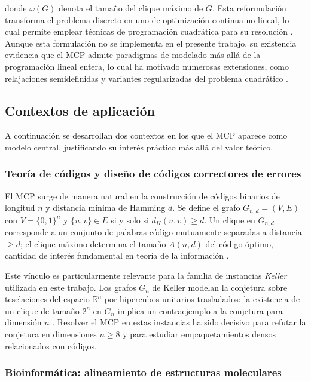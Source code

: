 \noindent donde $\omega(G)$ denota el tamaño del clique máximo de $G$. Esta reformulación transforma el problema discreto en uno de optimización continua no lineal, lo cual permite emplear técnicas de programación cuadrática para su resolución \parencite{pardalos1994maximum, bomze1999}. Aunque esta formulación no se implementa en el presente trabajo, su existencia evidencia que el MCP admite paradigmas de modelado más allá de la programación lineal entera, lo cual ha motivado numerosas extensiones, como relajaciones semidefinidas y variantes regularizadas del problema cuadrático \parencite{bomze1999}.

\subsection{Contextos de aplicación}\label{subsec:aplicaciones}

A continuación se desarrollan dos contextos en los que el MCP aparece como modelo central, justificando su interés práctico más allá del valor teórico.

\subsubsection{Teoría de códigos y diseño de códigos correctores de errores}

El MCP surge de manera natural en la construcción de códigos binarios de longitud $n$ y distancia mínima de Hamming $d$. Se define el grafo $G_{n,d}=(V,E)$ con $V=\{0,1\}^n$ y $\{u,v\}\in E$ si y solo si $d_H(u,v)\geq d$. Un clique en $G_{n,d}$ corresponde a un conjunto de palabras código mutuamente separadas a distancia $\geq d$; el clique máximo determina el tamaño $A(n,d)$ del código óptimo, cantidad de interés fundamental en teoría de la información \parencite{bomze1999}.

Este vínculo es particularmente relevante para la familia de instancias \textit{Keller} utilizada en este trabajo. Los grafos $G_n$ de Keller modelan la conjetura sobre teselaciones del espacio $\mathbb{R}^n$ por hipercubos unitarios trasladados: la existencia de un clique de tamaño $2^n$ en $G_n$ implica un contraejemplo a la conjetura para dimensión $n$ \parencite{lagarias1992keller}. Resolver el MCP en estas instancias ha sido decisivo para refutar la conjetura en dimensiones $n \geq 8$ y para estudiar empaquetamientos densos relacionados con códigos.

\subsubsection{Bioinformática: alineamiento de estructuras moleculares}

